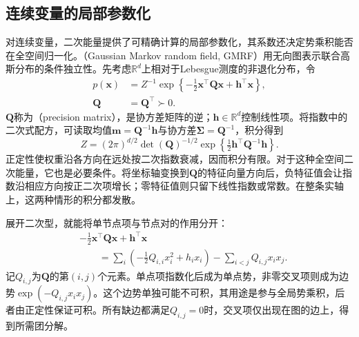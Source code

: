 \subsection{连续变量的局部参数化}
\label{sec:pgm-undirected-continuous-parameterization}

对连续变量，二次能量提供了可精确计算的局部参数化，其系数还决定势乘积能否在全空间归一化。（Gaussian Markov random field, GMRF）用无向图表示联合高斯分布的条件独立性。先考虑$\mathbb{R}^d$上相对于Lebesgue测度的非退化分布，令
\begin{equation}
  \begin{aligned}
    p(\bm{x})&=Z^{-1}
      \exp\left\{-\tfrac12\bm{x}^{\top}\bm{Q}\bm{x}
                   +\bm{h}^{\top}\bm{x}\right\},\\
    \bm{Q}&=\bm{Q}^{\top}\succ0.
  \end{aligned}
  \label{eq:pgm-undirected-gaussian}
\end{equation}
$\bm{Q}$称为（precision matrix），是协方差矩阵的逆；$\bm{h}\in\mathbb{R}^d$控制线性项。将指数中的二次式配方，可读取均值$\bm{m}=\bm{Q}^{-1}\bm{h}$与协方差$\bm{\Sigma}=\bm{Q}^{-1}$，积分得到
\begin{equation}
  Z=(2\pi)^{d/2}\det(\bm{Q})^{-1/2}
     \exp\left\{\tfrac12\bm{h}^{\top}\bm{Q}^{-1}\bm{h}\right\}.
  \label{eq:pgm-undirected-gaussian-partition}
\end{equation}
正定性使权重沿各方向在远处按二次指数衰减，因而积分有限。对于这种全空间二次能量，它也是必要条件。将坐标轴变换到$\bm{Q}$的特征向量方向后，负特征值会让指数沿相应方向按正二次项增长；零特征值则只留下线性指数或常数。在整条实轴上，这两种情形的积分都发散。

展开二次型，就能将单节点项与节点对的作用分开：
\[
  \begin{aligned}
    &-\tfrac12\bm{x}^{\top}\bm{Q}\bm{x}+\bm{h}^{\top}\bm{x}\\
    &\qquad=\sum_i\left(-\tfrac12 Q_{i,i}x_i^2+h_i x_i\right)
             -\sum_{i<j}Q_{i,j}x_i x_j.
  \end{aligned}
\]
记$Q_{i,j}$为$\bm{Q}$的第$(i,j)$个元素。单点项指数化后成为单点势，非零交叉项则成为边势$\exp(-Q_{i,j}x_i x_j)$。这个边势单独可能不可积，其用途是参与全局势乘积，后者由正定性保证可积。所有缺边都满足$Q_{i,j}=0$时，交叉项仅出现在图的边上，得到所需团分解。


